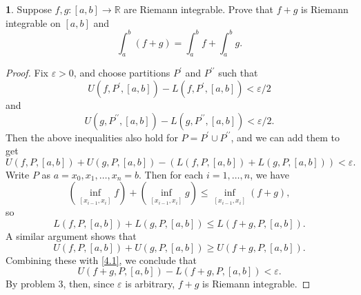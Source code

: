 \documentclass[12pt]{article}
\theoremstyle{definition}
\newtheorem{ex}{}
\begin{document}
\begin{ex}
	Suppose $f, g: [a, b] \to \mathbb{R}$ are Riemann integrable.
	Prove that $f + g$ is Riemann integrable on $[a, b]$ and \begin{equation*}
		\int_a^b (f + g) = \int_a^b f + \int_a^b g.
	\end{equation*}
\end{ex}
\begin{proof}
	Fix $\varepsilon > 0$, and choose partitions $P^{\prime}$ and $P^{\prime\prime}$ such that \begin{equation*}
		U(f, P^{\prime}, [a, b]) - L(f, P^{\prime}, [a, b]) < \varepsilon/2
	\end{equation*}
	and \begin{equation*}
		U(g, P^{\prime\prime}, [a, b]) - L(g, P^{\prime\prime}, [a, b]) < \varepsilon/2.
	\end{equation*}
	Then the above inequalities also hold for $P = P^\prime \cup P^{\prime\prime}$, and we can add them to get \begin{equation} \label{4.1}
		U(f, P, [a, b]) + U(g, P, [a, b]) - \left( L(f, P, [a, b]) + L(g, P, [a, b]) \right) < \varepsilon.
	\end{equation}
	Write $P$ as $a = x_0, x_1, \dots, x_n = b$.
	Then for each $i = 1, \dots, n$, we have \begin{equation*}
		\left( \inf_{[x_{i - 1}, x_i]} f \right) + \left( \inf_{[x_{i - 1}, x_i]} g \right) \leq \inf_{[x_{i-1}, x_i]} \left( f + g \right),
	\end{equation*}
	so \begin{equation} \label{4.2}
		L(f, P, [a, b]) + L(g, P, [a, b]) \leq L(f + g, P, [a, b]).
	\end{equation}
	A similar argument shows that \begin{equation} \label{4.3}
		U(f, P, [a, b]) + U(g, P, [a, b]) \geq U(f + g, P, [a, b]).
	\end{equation}
	Combining these with \eqref{4.1}, we conclude that \begin{equation*}
		U(f + g , P, [a, b]) - L(f + g, P, [a, b]) < \varepsilon.
	\end{equation*}
	By problem 3, then, since $\varepsilon$ is arbitrary, $f + g$ is Riemann integrable.


\end{proof}
\end{document}
